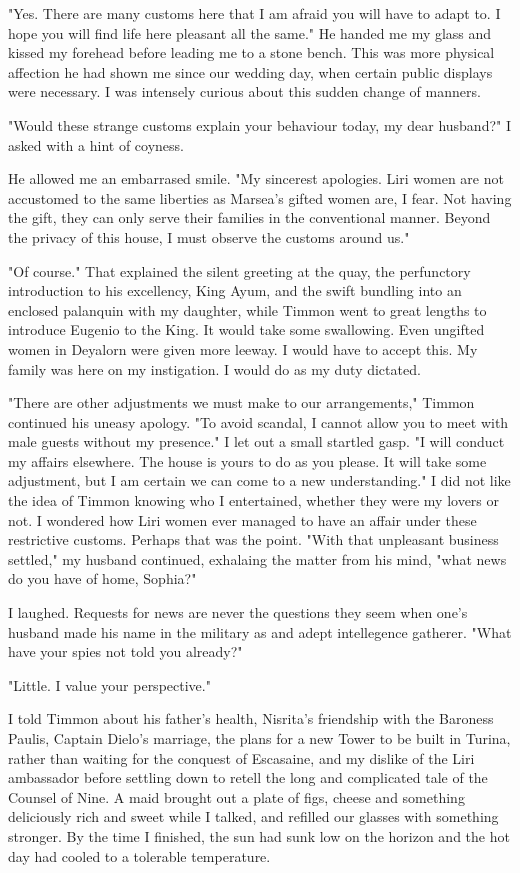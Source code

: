 \documentclass{article}
\begin{document}
"Yes. There are many customs here that I am afraid you will have to adapt to. I hope you will find life here pleasant all the same." He handed me my glass and kissed my forehead before leading me to a stone bench. This was more physical affection he had shown me since our wedding day, when certain public displays were necessary. I was intensely curious about this sudden change of manners.

"Would these strange customs explain your behaviour today, my dear husband?" I asked with a hint of coyness. 

He allowed me an embarrased smile. "My sincerest apologies. Liri women are not accustomed to the same liberties as Marsea's gifted women are, I fear. Not having the gift, they can only serve their families in the conventional manner. Beyond the privacy of this house, I must observe the customs around us."

"Of course." That explained the silent greeting at the quay, the perfunctory introduction to his excellency, King Ayum, and the swift bundling into an enclosed palanquin with my daughter, while Timmon went to great lengths to introduce Eugenio to the King. It would take some swallowing. Even ungifted women in Deyalorn were given more leeway. I would have to accept this. My family was here on my instigation. I would do as my duty dictated.

"There are other adjustments we must make to our arrangements," Timmon continued his uneasy apology. "To avoid scandal, I cannot allow you to meet with male guests without my presence." I let out a small startled gasp. "I will conduct my affairs elsewhere. The house is yours to do as you please. It will take some adjustment, but I am certain we can come to a new understanding."  I did not like the idea of Timmon knowing who I entertained, whether they were my lovers or not. I wondered how Liri women ever managed to have an affair under these restrictive customs. Perhaps that was the point. "With that unpleasant business settled," my husband continued, exhalaing the matter from his mind, "what news do you have of home, Sophia?"

I laughed. Requests for news are never the questions they seem when one's husband made his name in the military as and adept intellegence gatherer. "What have your spies not told you already?"

"Little. I value your perspective."

I told Timmon about his father's health, Nisrita's friendship with the Baroness Paulis, Captain Dielo's marriage, the plans for a new Tower to be built in Turina, rather than waiting for the conquest of Escasaine, and my dislike of the Liri ambassador before settling down to retell the long and complicated tale of the Counsel of Nine. A maid brought out a plate of figs, cheese and something deliciously rich and sweet while I talked, and refilled our glasses with something stronger. By the time I finished, the sun had sunk low on the horizon and the hot day had cooled to a tolerable temperature. 
\end{document}
